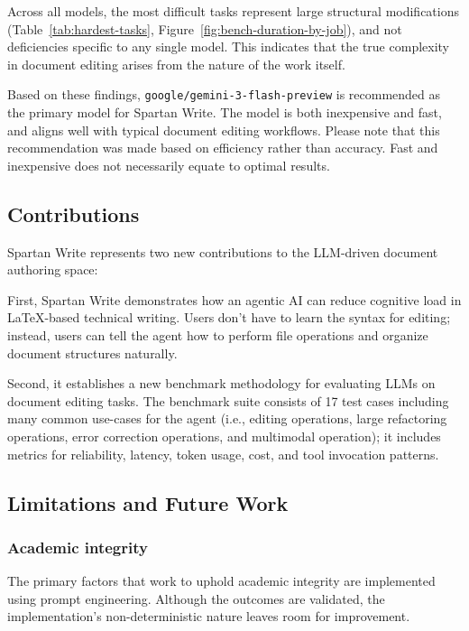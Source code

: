 Across all models, the most difficult tasks represent large structural modifications (Table~\ref{tab:hardest-tasks}, Figure~\ref{fig:bench-duration-by-job}), and not deficiencies specific to any single model.
This indicates that the true complexity in document editing arises from the nature of the work itself.

Based on these findings, \texttt{google/gemini-3-flash-preview} is recommended as the primary model for Spartan Write.
The model is both inexpensive and fast, and aligns well with typical document editing workflows.
Please note that this recommendation was made based on efficiency rather than accuracy.
Fast and inexpensive does not necessarily equate to optimal results.


\subsection{Contributions}

Spartan Write represents two new contributions to the LLM-driven document authoring space:

First, Spartan Write demonstrates how an agentic AI can reduce cognitive load in \LaTeX-based technical writing.
Users don't have to learn the syntax for editing; instead, users can tell the agent how to perform file operations and organize document structures naturally.

Second, it establishes a new benchmark methodology for evaluating LLMs on document editing tasks.
The benchmark suite consists of 17 test cases including many common use-cases for the agent (i.e., editing operations, large refactoring operations, error correction operations, and multimodal operation); it includes metrics for reliability, latency, token usage, cost, and tool invocation patterns.


\subsection{Limitations and Future Work}

\subsubsection{Academic integrity}

The primary factors that work to uphold academic integrity are implemented using prompt engineering.
Although the outcomes are validated, the implementation’s non-deterministic nature leaves room for improvement.

